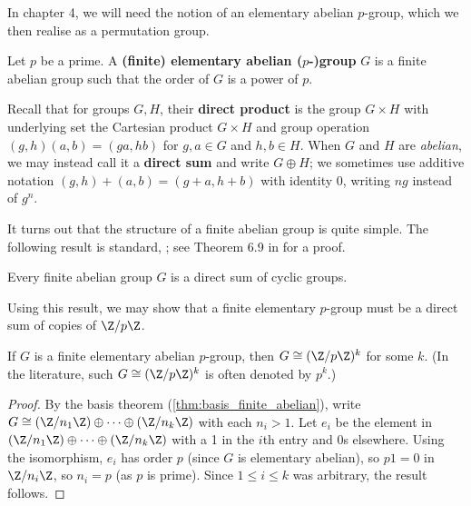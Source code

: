 In chapter 4, we will need the notion of an elementary abelian $p$-group, which we then realise as a permutation group.

\begin{definition}\label{def:elem-abelian-group}
    Let $p$ be a prime. A \textbf{(finite) elementary abelian ($p$-)group} $G$ is a finite abelian group such that the order of $G$ is a power of $p$.

\end{definition}

Recall that for groups $G,H$, their \textbf{direct product} is the group $G \times H$ with underlying set the Cartesian product $G \times H$ and group operation $(g,h)(a,b) = (ga,hb)$ for $g,a \in G$ and $h,b \in H$. When $G$ and $H$ are \textit{abelian}, we may instead call it a \textbf{direct sum} and write $G \oplus H$; we sometimes use additive notation $(g,h) + (a,b) = (g+a,h+b)$ with identity $0$, writing $ng$ instead of $g^n$.

It turns out that the structure of a finite abelian group is quite simple. The following result is standard, ; see Theorem 6.9 in \cite{rotman_intro_theory_groups1995} for a proof.

\begin{theorem}\label{thm:basis_finite_abelian}
    Every finite abelian group $G$ is a direct sum of cyclic groups.
\end{theorem}

Using this result, we may show that a finite elementary $p$-group must be a direct sum of copies of $\Z/p\Z$.

\begin{corollary}\label{cor:elementary_abelian_group_form}
    If $G$ is a finite elementary abelian $p$-group, then $G \cong (\Z/p\Z)^k$ for some $k$. (In the literature, such $G \cong (\Z/p\Z)^k$ is often denoted by $p^k$.)
\end{corollary}

\begin{proof}
    By the basis theorem (\autoref{thm:basis_finite_abelian}), write $G \cong (\Z/n_1\Z) \oplus \dotsb \oplus (\Z/n_k\Z)$ with each $n_i > 1$. Let $e_i$ be the element in $(\Z/n_1\Z) \oplus \dotsb \oplus (\Z/n_k\Z)$ with a 1 in the $i$th entry and 0s elsewhere. Using the isomorphism, $e_i$ has order $p$ (since $G$ is elementary abelian), so $p1 = 0$ in $\Z/n_i\Z$, so $n_i = p$ (as $p$ is prime). Since $1 \leq i \leq k$ was arbitrary, the result follows.
\end{proof}

